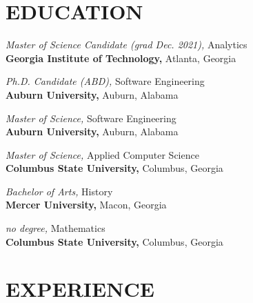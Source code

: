 \documentclass[margin, 10pt]{res} %
\begin{document}
\begin{resume}

\section{EDUCATION}

    {\it Master of Science Candidate (grad Dec. 2021),} Analytics\\
\textbf{Georgia Institute of Technology,} Atlanta, Georgia

    {\it Ph.D. Candidate (ABD),} Software Engineering\\
\textbf{Auburn University,} Auburn, Alabama

{\it Master of Science,} Software Engineering\\
\textbf{Auburn University,} Auburn, Alabama

{\it Master of Science,} Applied Computer Science\\
\textbf{Columbus State University,} Columbus, Georgia

{\it Bachelor of Arts,} History\\
\textbf{Mercer University,} Macon, Georgia

{\it no degree,} Mathematics\\
\textbf{Columbus State University,} Columbus, Georgia

 
\section{EXPERIENCE}
 
%



\end{resume}
\end{document}
